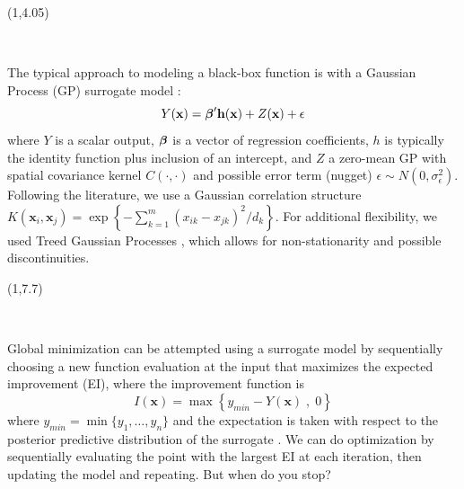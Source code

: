 \documentclass[a0,landscape]{a0poster}
\newcommand{\boldgreek}[1]{\mbox{\boldmath $#1$}}
\newcommand{\co}[2]{{{\bf \color{#1}{#2}}}}
\begin{document}
\begin{textblock}{6}(1,4.05)

\begin{center}
\LARGE \textsc{\co{green}{Gaussian Process Surrogates}}\\
\end{center}
\medskip

\large
\noindent
The typical approach to modeling a black-box function is with a
Gaussian Process (GP) surrogate model \citep{santnerBook}:
\[ Y(\mathbf{x}) = \boldgreek{\beta}'\mathbf{h}(\mathbf{x}) +
Z(\mathbf{x}) + \epsilon \]
where $Y$ is a scalar output, $\boldgreek{\beta}$ is a vector of
regression coefficients, $h$ is typically the identity function plus
inclusion of an intercept, and $Z$ a zero-mean GP with spatial
covariance kernel $C(\cdot,\cdot)$ and possible error term (nugget)
$\epsilon\sim N(0,\sigma_{\epsilon}^2)$. Following the literature, we
use a Gaussian correlation structure $K(\mathbf{x}_i,\mathbf{x}_j) =
\exp\left\{- \sum_{k=1}^m (x_{ik}-x_{jk})^2/d_k\right\}$.
For additional flexibility, we used Treed Gaussian Processes
\citep{gramacy2012}, which allows for non-stationarity and possible
discontinuities.
\end{textblock}

\begin{textblock}{6}(1,7.7)

\begin{center}
\LARGE \textsc{\co{blue}{Optimization with Expected Improvement}}\\
\end{center}
\large

\noindent
Global minimization can be attempted using a surrogate model by
sequentially choosing a new function evaluation at the input that
maximizes the expected improvement (EI), where the improvement
function is 
\[ I(\mathbf{x}) = \max\left\{ y_{min}-Y(\mathbf{x})\;,\; 0\right\} \]
where $y_{min}=\min\{y_1,\ldots,y_n\}$ and the expectation is taken
with respect to the posterior predictive distribution of the
surrogate \citep{jonesEIOpt}. We can do optimization by sequentially
evaluating the point with the largest EI at each iteration, then
updating the model and repeating. But when do you stop?

\end{textblock}
\end{document}
